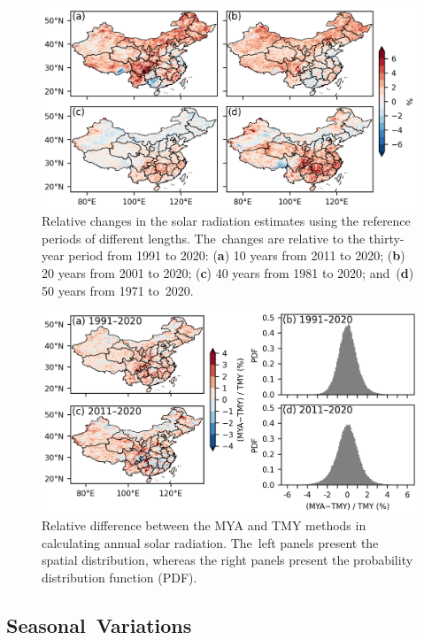 \documentclass[atmosphere,article,accept,pdftex,moreauthors]{Definitions/mdpi}
\begin{document}
\begin{figure}[H]
  \includegraphics[width=13.8cm]{fig/tmy-change-datalength.png}
  \caption{Relative changes in the solar radiation estimates using the reference periods of different lengths. The~changes are relative to the thirty-year period from 1991 to 2020\@: (\textbf{a}) 10 years from 2011 to 2020; (\textbf{b}) 20 years from 2001 to 2020; (\textbf{c}) 40 years from 1981 to 2020; and~(\textbf{d}) 50 years from 1971 to~2020.\label{fig:tmy_length}}
\end{figure}
\vspace{-6pt}

\begin{figure}[H]
  \includegraphics[width=13.8cm]{fig/mya-tmy-diff-hist.png}
  \caption{Relative difference between the MYA and TMY methods in calculating annual solar radiation. The~left panels present the spatial distribution, whereas the right panels present the probability distribution function (PDF).\label{fig:tmy_mya_diff_mean}}
\end{figure}
\unskip

\subsection{Seasonal~Variations}
\end{document}
